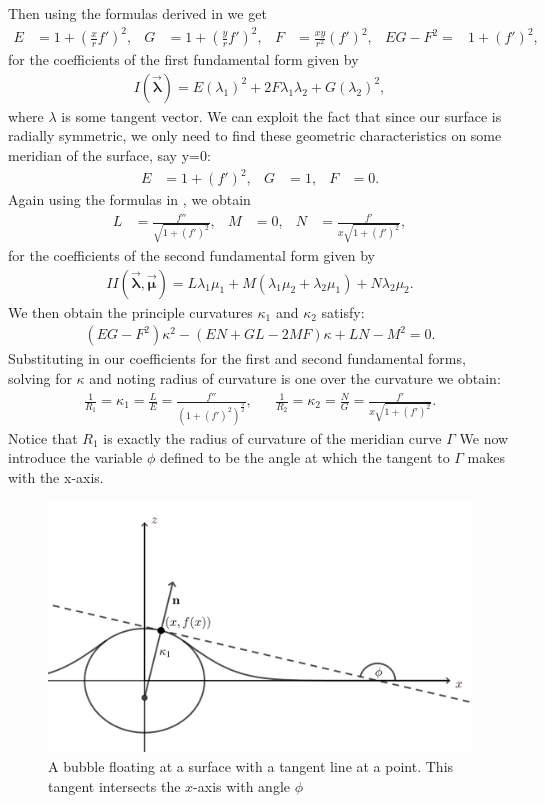 Then using the formulas derived in \cite{toponogov2006differential} we get
\begin{align}
    E&=1+(\frac{x}{r}f')^2,&G&=1+(\frac{y}{r}f')^2, &F&=\frac{xy}{r^2}(f')^2, &EG-F^2=&1+(f')^2,
\end{align}
for the coefficients of the first fundamental form given by
\begin{align}
    I( \vec{ \boldsymbol\lambda}) = E(\lambda_1)^2 +2F\lambda_1 \lambda_2 + G(\lambda_2)^2,
\end{align}
where $\lambda$ is some tangent vector. We can exploit the fact that since our surface is radially symmetric, we only need to find these geometric characteristics on some meridian of the surface, say y=0:
\begin{align}
    E&=1+(f')^2,& G&=1, &F&=0.
\end{align}
Again using the formulas in \cite{toponogov2006differential}, we obtain
\begin{align}
    L&=\frac{f''}{\sqrt{1+(f')^2}},&M&=0,&  N&=\frac{f'}{x\sqrt{1+(f')^2}},
\end{align}
for the coefficients of the second fundamental form given by
\begin{align}
    II( \vec{ \boldsymbol\lambda},\vec{ \boldsymbol\mu}) = L\lambda_1 \mu_1 +M(\lambda_1\mu_2 + \lambda_2 \mu_1)  + N\lambda_2 \mu_2.
\end{align}
We then obtain the principle curvatures $\kappa_1$ and $\kappa_2$ satisfy:
\begin{align}
    (EG-F^2)\kappa^2 - (EN+GL -2MF)\kappa +LN-M^2 = 0.
\end{align}
Substituting in our coefficients for the first and second fundamental forms, solving for $\kappa$ and noting radius of curvature is one over the curvature we obtain:
\begin{align}
    \frac{1}{R_1} =\kappa_1= \frac{L}{E}=\frac{f''}{(1+(f')^2)^{\frac{3}{2}}}, && \frac{1}{R_2} = \kappa_2 = \frac{N}{G} = \frac{f'}{x \sqrt{1+(f')^2}}.
\end{align}
Notice that $R_1$ is exactly the radius of curvature of the meridian curve $\Gamma$
We now introduce the variable $\phi$ defined to be the angle at which the tangent to $\Gamma$ makes with the x-axis. 
\begin{figure}
    \centering
    \includegraphics[width=0.75\linewidth]{WriteUp/images/tangent to bubble extra.png}
    \caption{A bubble floating at a surface with a tangent line at a point. This tangent intersects the $x$-axis with angle $\phi$}
    \label{fig:3}
\end{figure}
